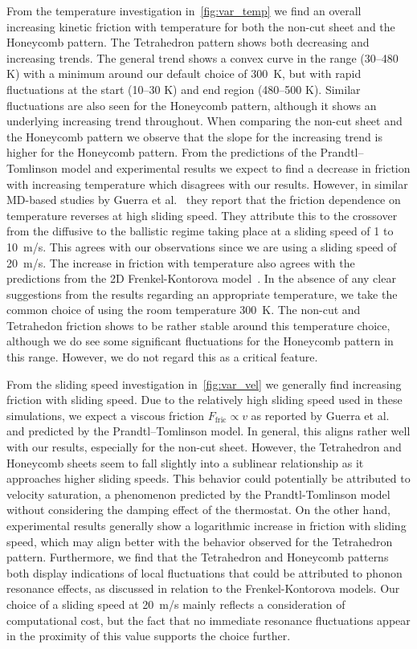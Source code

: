 From the temperature investigation in~\cref{fig:var_temp} we find an overall increasing
kinetic friction with temperature for both the non-cut sheet and the Honeycomb
pattern. The Tetrahedron pattern shows both decreasing and increasing trends.
The general trend shows a convex curve in the range (30--480 K) with a minimum
around our default choice of \SI{300}{K}, but with rapid fluctuations at the
start (10--30 K) and end region (480--500 K). Similar fluctuations are also seen
for the Honeycomb pattern, although it shows an underlying increasing trend
throughout. When comparing the non-cut sheet and the Honeycomb pattern we
observe that the slope for the increasing trend is higher for the Honeycomb
pattern. From the predictions of the Prandtl–Tomlinson model and experimental results we expect to find a decrease in friction with increasing temperature which disagrees with our results. However, in similar \acrshort{MD}-based studies by Guerra et al.~\cite{Guerra_2010} they report that the friction dependence on temperature reverses at high sliding speed. They attribute this to the crossover from the diffusive to the ballistic regime taking place at a sliding speed of 1 to \SI{10}{m/s}. This agrees with our observations since we are using a sliding speed of \SI{20}{m/s}. The increase in friction with temperature also agrees with the predictions from the 2D Frenkel-Kontorova model~\cite{FK2D}. In the absence of any clear suggestions from the results regarding an appropriate temperature, we take the common choice of using the room temperature \SI{300}{K}. The non-cut and Tetrahedon friction shows to be rather
stable around this temperature choice, although we do see some significant fluctuations for the Honeycomb pattern in this range. However, we do not regard this as a critical feature.

From the sliding speed investigation in~\cref{fig:var_vel} we generally find
increasing friction with sliding speed. Due to the relatively high sliding speed used in
these simulations, we expect a viscous friction $F_{\text{fric}} \propto v$
as reported by Guerra et al.~\cite{Guerra_2010} and predicted by the
Prandtl–Tomlinson model. In general, this aligns rather well with our results,
especially for the non-cut sheet. However, the Tetrahedron and Honeycomb sheets
seem to fall slightly into a sublinear relationship as it approaches higher
sliding speeds. This behavior could potentially be attributed to velocity
saturation, a phenomenon predicted by the Prandtl-Tomlinson model without
considering the damping effect of the thermostat. On the other hand,
experimental results generally show a logarithmic increase in friction with
sliding speed, which may align better with the behavior observed for the Tetrahedron
pattern. Furthermore, we find that the Tetrahedron and Honeycomb patterns both
display indications of local fluctuations that could be attributed
to phonon resonance effects, as discussed in relation to the Frenkel-Kontorova
models. Our choice of a sliding speed at \SI{20}{m/s} mainly reflects a consideration of computational cost, but the fact that no immediate resonance
fluctuations appear in the proximity of this value supports the choice further.  

